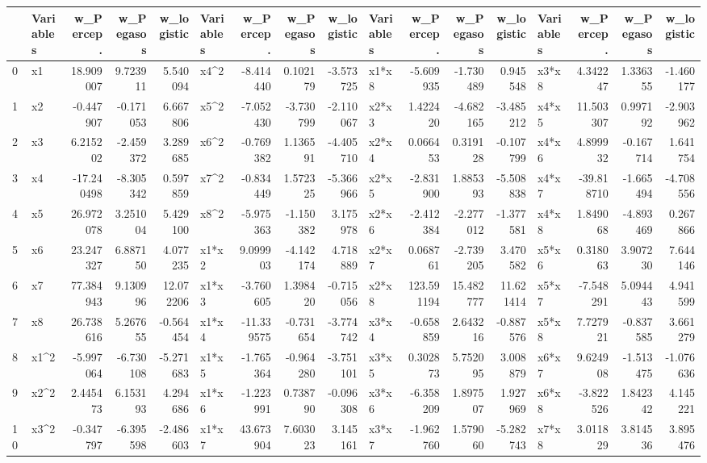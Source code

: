\begin{tabular}{llrrrlrrrlrrrlrrr}
\toprule
 & Variables & w_Percep. & w_Pegasos & w_logistic & Variables & w_Percep. & w_Pegasos & w_logistic & Variables & w_Percep. & w_Pegasos & w_logistic & Variables & w_Percep. & w_Pegasos & w_logistic \\
\midrule
0 & x1 & 18.909007 & 9.723911 & 5.540094 & x4^2 & -8.414440 & 0.102179 & -3.573725 & x1*x8 & -5.609935 & -1.730489 & 0.945548 & x3*x8 & 4.342247 & 1.336355 & -1.460177 \\
1 & x2 & -0.447907 & -0.171053 & 6.667806 & x5^2 & -7.052430 & -3.730799 & -2.110067 & x2*x3 & 1.422420 & -4.682165 & -3.485212 & x4*x5 & 11.503307 & 0.997192 & -2.903962 \\
2 & x3 & 6.215202 & -2.459372 & 3.289685 & x6^2 & -0.769382 & 1.136591 & -4.405710 & x2*x4 & 0.066453 & 0.319128 & -0.107799 & x4*x6 & 4.899932 & -0.167714 & 1.641754 \\
3 & x4 & -17.240498 & -8.305342 & 0.597859 & x7^2 & -0.834449 & 1.572325 & -5.366966 & x2*x5 & -2.831900 & 1.885393 & -5.508838 & x4*x7 & -39.818710 & -1.665494 & -4.708556 \\
4 & x5 & 26.972078 & 3.251004 & 5.429100 & x8^2 & -5.975363 & -1.150382 & 3.175978 & x2*x6 & -2.412384 & -2.277012 & -1.377581 & x4*x8 & 1.849068 & -4.893469 & 0.267866 \\
5 & x6 & 23.247327 & 6.887150 & 4.077235 & x1*x2 & 9.099903 & -4.142174 & 4.718889 & x2*x7 & 0.068761 & -2.739205 & 3.470582 & x5*x6 & 0.318063 & 3.907230 & 7.644146 \\
6 & x7 & 77.384943 & 9.130996 & 12.072206 & x1*x3 & -3.760605 & 1.398420 & -0.715056 & x2*x8 & 123.591194 & 15.482777 & 11.621414 & x5*x7 & -7.548291 & 5.094443 & 4.941599 \\
7 & x8 & 26.738616 & 5.267655 & -0.564454 & x1*x4 & -11.339575 & -0.731654 & -3.774742 & x3*x4 & -0.658859 & 2.643216 & -0.887576 & x5*x8 & 7.727921 & -0.837585 & 3.661279 \\
8 & x1^2 & -5.997064 & -6.730108 & -5.271683 & x1*x5 & -1.765364 & -0.964280 & -3.751101 & x3*x5 & 0.302873 & 5.752095 & 3.008879 & x6*x7 & 9.624908 & -1.513475 & -1.076636 \\
9 & x2^2 & 2.445473 & 6.153193 & 4.294686 & x1*x6 & -1.223991 & 0.738790 & -0.096308 & x3*x6 & -6.358209 & 1.897507 & 1.927969 & x6*x8 & -3.822526 & 1.842342 & 4.145221 \\
10 & x3^2 & -0.347797 & -6.395598 & -2.486603 & x1*x7 & 43.673904 & 7.603023 & 3.145161 & x3*x7 & -1.962760 & 1.579060 & -5.282743 & x7*x8 & 3.011829 & 3.814536 & 3.895476 \\
\bottomrule
\end{tabular}
